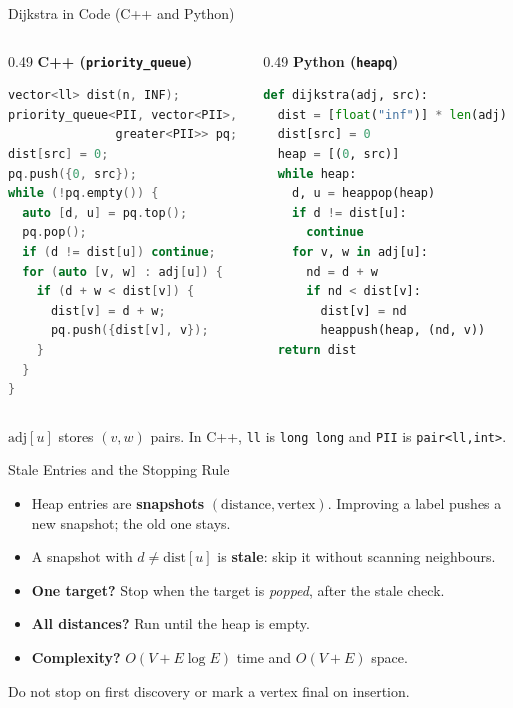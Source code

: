 \documentclass{beamer}
\begin{document}
\begin{frame}[fragile]{Dijkstra in Code (C++ and Python)}
  \begin{columns}[t]
    \begin{column}{0.49\textwidth}
      \textbf{C++ (\texttt{priority\_queue})}
\begin{lstlisting}[language=C++]
vector<ll> dist(n, INF);
priority_queue<PII, vector<PII>,
               greater<PII>> pq;
dist[src] = 0;
pq.push({0, src});
while (!pq.empty()) {
  auto [d, u] = pq.top();
  pq.pop();
  if (d != dist[u]) continue;
  for (auto [v, w] : adj[u]) {
    if (d + w < dist[v]) {
      dist[v] = d + w;
      pq.push({dist[v], v});
    }
  }
}
\end{lstlisting}
    \end{column}
    \begin{column}{0.49\textwidth}
      \textbf{Python (\texttt{heapq})}
\begin{lstlisting}[language=Python]
def dijkstra(adj, src):
  dist = [float("inf")] * len(adj)
  dist[src] = 0
  heap = [(0, src)]
  while heap:
    d, u = heappop(heap)
    if d != dist[u]:
      continue
    for v, w in adj[u]:
      nd = d + w
      if nd < dist[v]:
        dist[v] = nd
        heappush(heap, (nd, v))
  return dist
\end{lstlisting}
    \end{column}
  \end{columns}
  \medskip
  {\scriptsize $\mathrm{adj}[u]$ stores $(v,w)$ pairs. In C++, \texttt{ll} is \texttt{long long} and \texttt{PII} is \texttt{pair<ll,int>}.}
\end{frame}

\begin{frame}{Stale Entries and the Stopping Rule}
  \begin{itemize}
    \item Heap entries are \textbf{snapshots} $(\mathrm{distance}, \text{vertex})$. Improving a label pushes a new snapshot; the old one stays.
    \item A snapshot with $d\ne\mathrm{dist}[u]$ is \textbf{stale}: skip it without scanning neighbours.
    \item \textbf{One target?} Stop when the target is \emph{popped}, after the stale check.
    \item \textbf{All distances?} Run until the heap is empty.
    \item \textbf{Complexity?} $O(V+E\log E)$ time and $O(V+E)$ space.
  \end{itemize}
  \medskip
  \alert{Do not stop on first discovery or mark a vertex final on insertion.}
\end{frame}
\end{document}
